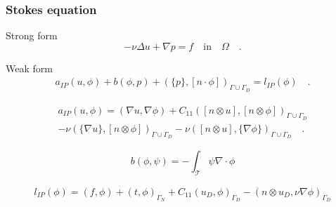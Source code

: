 \documentclass{beamer}
\begin{document}

\begin{frame}
\frametitle{Stokes equation}
\begin{block}{Strong form}
\begin{equation} \label{stokes_strong_form_ch3}
-\nu \Delta u + \nabla p = f \quad \textrm{in} \quad \Omega \quad \textrm{.}
\end{equation}
\end{block}
\begin{block}{Weak form}
\begin{equation}\label{stokes_weak_ch3}
\begin{split}
a_{IP}(u,\phi) + b(\phi,p) + (\{p\},[n\cdot \phi])_{\Gamma \cup \Gamma_D} = l_{IP}(\phi) \quad \textrm{.}
\end{split}
\end{equation}

\begin{equation}
\begin{split}
a_{IP}(u,\phi) = (\nabla u, \nabla \phi) + C_{11} ([n \otimes u],[n \otimes \phi])_{\Gamma \cup \Gamma_D} \\
- \nu (\{\nabla u\},[n \otimes \phi])_{\Gamma \cup \Gamma_D} - \nu ([n \otimes u],\{\nabla \phi\})_{\Gamma \cup \Gamma_D} \quad \textrm{.}
\end{split}
\end{equation}

\begin{equation}
b(\phi,\psi) = -\int_{\mathcal{T}} \psi \nabla \cdot \phi
\end{equation}

\begin{equation}
\begin{split}
l_{IP}(\phi) = (f,\phi) + (t,\phi)_{\Gamma_N} + C_{11} (u_D,\phi)_{\Gamma_D} - (n \otimes u_D, \nu \nabla \phi)_{\Gamma_D}
\end{split}
\end{equation}

\end{block}
\end{frame}

\end{document}
